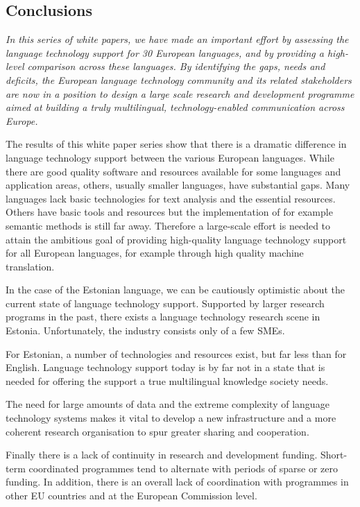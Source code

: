 \begin{multicols}{2}
\subsection{Conclusions}

\emph{In this series of white papers, we have made an important effort by assessing the language technology support for 30 European languages, and by providing a high-level comparison across these languages. By identifying the gaps, needs and deficits, the European language technology community and its related stakeholders are now in a position to design a large scale research and development programme aimed at building a truly multilingual, technology-enabled communication across Europe.}

The results of this white paper series show that there is a dramatic difference in language technology support between the various European languages. While there are good quality software and resources available for some languages and application areas, others, usually smaller languages, have substantial gaps. Many languages lack basic technologies for text analysis and the essential resources. Others have basic tools and resources but the implementation of for example semantic methods is still far away. Therefore a large-scale effort is needed to attain the ambitious goal of providing high-quality language technology support for all European languages, for example through high quality machine translation.

In the case of the Estonian language, we can be cautiously optimistic about the current state of language technology support. Supported by larger research programs in the past, there exists a language technology research scene in Estonia. Unfortunately, the industry consists only of a few SMEs.
\columnbreak

For Estonian, a number of technologies and resources exist, but far less than for English. 
Language technology support today is by far not in a state that is needed for offering the support a true multilingual knowledge society needs.

The need for large amounts of data and the extreme complexity of language technology systems makes it vital to develop a new infrastructure and a more coherent research organisation to spur greater sharing and cooperation.

Finally there is a lack of continuity in research and development funding. Short-term coordinated programmes tend to alternate with periods of sparse or zero funding. In addition, there is an overall lack of coordination with programmes in other EU countries and at the European Commission level.


\end{multicols}
